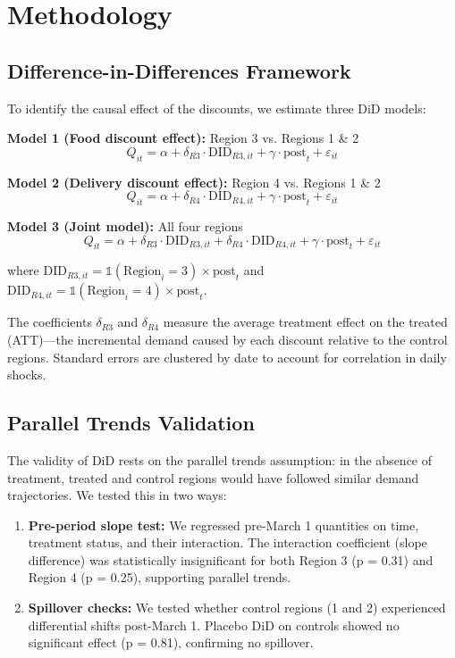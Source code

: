 \documentclass[12pt]{article}
\begin{document}
\section{Methodology}

\subsection{Difference-in-Differences Framework}

To identify the causal effect of the discounts, we estimate three DiD models:

\textbf{Model 1 (Food discount effect):} Region 3 vs. Regions 1 \& 2
\[
Q_{it} = \alpha + \delta_{R3} \cdot \text{DID}_{R3,it} + \gamma \cdot \text{post}_t + \varepsilon_{it}
\]

\textbf{Model 2 (Delivery discount effect):} Region 4 vs. Regions 1 \& 2
\[
Q_{it} = \alpha + \delta_{R4} \cdot \text{DID}_{R4,it} + \gamma \cdot \text{post}_t + \varepsilon_{it}
\]

\textbf{Model 3 (Joint model):} All four regions
\[
Q_{it} = \alpha + \delta_{R3} \cdot \text{DID}_{R3,it} + \delta_{R4} \cdot \text{DID}_{R4,it} + \gamma \cdot \text{post}_t + \varepsilon_{it}
\]

where $\text{DID}_{R3,it} = \mathbb{1}(\text{Region}_i = 3) \times \text{post}_t$ and $\text{DID}_{R4,it} = \mathbb{1}(\text{Region}_i = 4) \times \text{post}_t$.

The coefficients $\delta_{R3}$ and $\delta_{R4}$ measure the average treatment effect on the treated (ATT)—the incremental demand caused by each discount relative to the control regions. Standard errors are clustered by date to account for correlation in daily shocks.

\subsection{Parallel Trends Validation}

The validity of DiD rests on the parallel trends assumption: in the absence of treatment, treated and control regions would have followed similar demand trajectories. We tested this in two ways:

\begin{enumerate}[nosep]
    \item \textbf{Pre-period slope test:} We regressed pre-March 1 quantities on time, treatment status, and their interaction. The interaction coefficient (slope difference) was statistically insignificant for both Region 3 (p = 0.31) and Region 4 (p = 0.25), supporting parallel trends.
    \item \textbf{Spillover checks:} We tested whether control regions (1 and 2) experienced differential shifts post-March 1. Placebo DiD on controls showed no significant effect (p = 0.81), confirming no spillover.
\end{enumerate}
\end{document}
